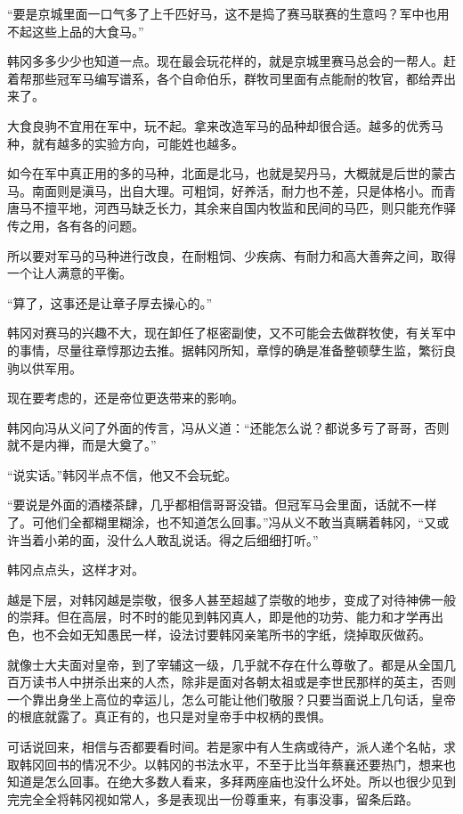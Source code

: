 “要是京城里面一口气多了上千匹好马，这不是捣了赛马联赛的生意吗？军中也用不起这些上品的大食马。”

韩冈多多少少也知道一点。现在最会玩花样的，就是京城里赛马总会的一帮人。赶着帮那些冠军马编写谱系，各个自命伯乐，群牧司里面有点能耐的牧官，都给弄出来了。

大食良驹不宜用在军中，玩不起。拿来改造军马的品种却很合适。越多的优秀马种，就有越多的实验方向，可能姓也越多。

如今在军中真正用的多的马种，北面是北马，也就是契丹马，大概就是后世的蒙古马。南面则是滇马，出自大理。可粗饲，好养活，耐力也不差，只是体格小。而青唐马不擅平地，河西马缺乏长力，其余来自国内牧监和民间的马匹，则只能充作驿传之用，各有各的问题。

所以要对军马的马种进行改良，在耐粗饲、少疾病、有耐力和高大善奔之间，取得一个让人满意的平衡。

“算了，这事还是让章子厚去操心的。”

韩冈对赛马的兴趣不大，现在卸任了枢密副使，又不可能会去做群牧使，有关军中的事情，尽量往章惇那边去推。据韩冈所知，章惇的确是准备整顿孽生监，繁衍良驹以供军用。

现在要考虑的，还是帝位更迭带来的影响。

韩冈向冯从义问了外面的传言，冯从义道：“还能怎么说？都说多亏了哥哥，否则就不是内禅，而是大奠了。”

“说实话。”韩冈半点不信，他又不会玩蛇。

“要说是外面的酒楼茶肆，几乎都相信哥哥没错。但冠军马会里面，话就不一样了。可他们全都糊里糊涂，也不知道怎么回事。”冯从义不敢当真瞒着韩冈，“又或许当着小弟的面，没什么人敢乱说话。得之后细细打听。”

韩冈点点头，这样才对。

越是下层，对韩冈越是崇敬，很多人甚至超越了崇敬的地步，变成了对待神佛一般的崇拜。但在高层，时不时的能见到韩冈真人，即是他的功劳、能力和才学再出色，也不会如无知愚民一样，设法讨要韩冈亲笔所书的字纸，烧掉取灰做药。

就像士大夫面对皇帝，到了宰辅这一级，几乎就不存在什么尊敬了。都是从全国几百万读书人中拼杀出来的人杰，除非是面对各朝太祖或是李世民那样的英主，否则一个靠出身坐上高位的幸运儿，怎么可能让他们敬服？只要当面说上几句话，皇帝的根底就露了。真正有的，也只是对皇帝手中权柄的畏惧。

可话说回来，相信与否都要看时间。若是家中有人生病或待产，派人递个名帖，求取韩冈回书的情况不少。以韩冈的书法水平，不至于比当年蔡襄还要热门，想来也知道是怎么回事。在绝大多数人看来，多拜两座庙也没什么坏处。所以也很少见到完完全全将韩冈视如常人，多是表现出一份尊重来，有事没事，留条后路。

